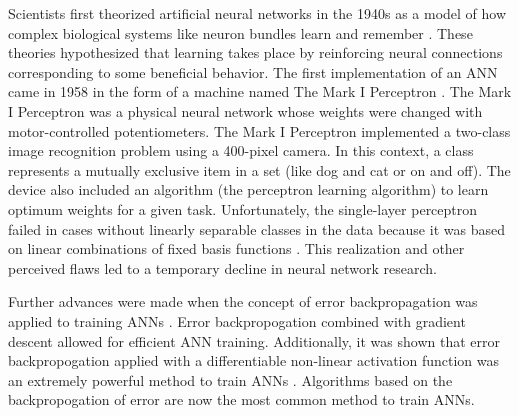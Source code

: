 Scientists first theorized artificial neural networks in the 1940s as a model of how complex biological systems like neuron bundles learn and remember \cite{Pitts1943, Hebb1949}. These theories hypothesized that learning takes place by reinforcing neural connections corresponding to some beneficial behavior. The first implementation of an ANN came in 1958 in the form of a machine named The Mark I Perceptron \cite{Rosenblatt1958, Rosenblatt1962}. The Mark I Perceptron was a physical neural network whose weights were changed with motor-controlled potentiometers. The Mark I Perceptron implemented a two-class image recognition problem using a 400-pixel camera. In this context, a class represents a mutually exclusive item in a set (like dog and cat or on and off). The device also included an algorithm (the perceptron learning algorithm) to learn optimum weights for a given task. Unfortunately, the single-layer perceptron failed in cases without linearly separable classes in the data because it was based on linear combinations of fixed basis functions \cite{Bishop2006, Minsky1969}. This realization and other perceived flaws led to a temporary decline in neural network research.




Further advances were made when the concept of error backpropagation was applied to training ANNs \cite{Werbos1974, Rumelhart1986}. Error backpropogation combined with gradient descent allowed for efficient ANN training. Additionally, it was shown that error backpropogation applied with a differentiable non-linear activation function was an extremely powerful method to train ANNs \cite{Murtagh1991}. Algorithms based on the backpropogation of error are now the most common method to train ANNs.

